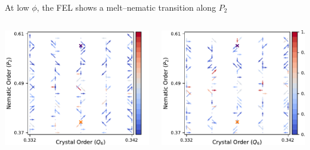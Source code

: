 \documentclass[aspectratio=169]{beamer}
\begin{document}
\begin{frame}[c]{At low $\phi$, the FEL shows a melt--nematic transition along $P_{2}$}

  \begin{columns}[T]

    \centering
    \includegraphics[width=\textwidth]{../figures/ch4_jcp/fig-quivers_10p75/fig-U_quiver_10.75.pdf}

    \centering
    \includegraphics[width=\textwidth]{../figures/ch4_jcp/fig-quivers_10p75/fig-mTS_quiver_10.75.pdf}

  \end{columns}

\end{frame}
\end{document}
